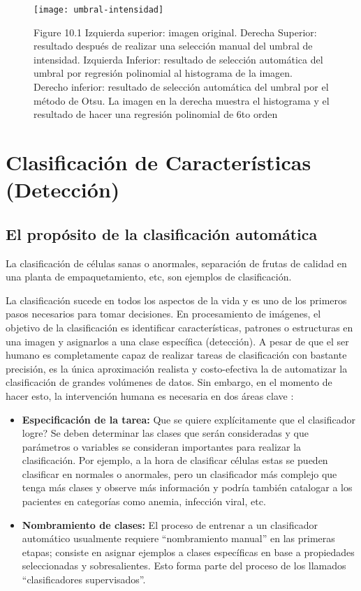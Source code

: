     \begin{figure}[H]
        \centering
        \texttt{[image: umbral-intensidad]}
        \caption{Figure 10.1 Izquierda superior: imagen original. Derecha Superior: resultado después de realizar una selección manual del umbral de intensidad. Izquierda Inferior: resultado de selección automática del umbral por regresión polinomial al histograma de la imagen. Derecho inferior: resultado de selección automática del umbral por el método de Otsu. La imagen en la derecha muestra el histograma y el resultado de hacer una regresión polinomial de 6to orden \parencite{Solomon2011-xz}}
        \label{fig:umbral-intensidad}
    \end{figure}
    


\section{Clasificación de Características (Detección)}
\subsection{El propósito de la clasificación automática}
La clasificación de células sanas o anormales, separación de frutas de calidad en una planta de empaquetamiento, etc, son ejemplos de clasificación. 

La clasificación sucede en todos los aspectos de la vida y es uno de los primeros pasos necesarios para tomar decisiones. En procesamiento de imágenes, el objetivo de la clasificación es identificar características, patrones o estructuras en una imagen y asignarlos a una clase específica (detección). A pesar de que el ser humano es completamente capaz de realizar tareas de clasificación con bastante precisión, es la única aproximación realista y costo-efectiva la de automatizar la clasificación de grandes volúmenes de datos. Sin embargo, en el momento de hacer esto, la intervención humana es necesaria en dos áreas clave \parencite{Solomon2011-xz}: 

\begin{itemize}
\item \textbf{Especificación de la tarea: }Que se quiere explícitamente que el clasificador logre? Se deben determinar las clases que serán consideradas y que parámetros o variables se consideran importantes para realizar la clasificación. Por ejemplo, a la hora de clasificar células estas se pueden clasificar en normales o anormales, pero un clasificador más complejo que tenga más clases y observe más información y podría también catalogar a los pacientes en categorías como anemia, infección viral, etc.
\item \textbf{Nombramiento de clases: }El proceso de entrenar a un clasificador automático usualmente requiere “nombramiento manual” en las primeras etapas; consiste en asignar ejemplos a clases específicas en base a propiedades seleccionadas y sobresalientes. Esto forma parte del proceso de los llamados “clasificadores supervisados”.
\end{itemize}

